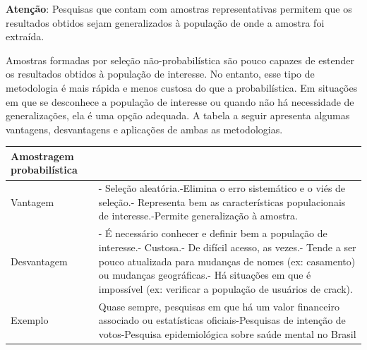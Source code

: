 \documentclass[
]{book}
\begin{document}
\textbf{Atenção}: Pesquisas que contam com amostras representativas permitem que os resultados obtidos sejam generalizados à população de onde a amostra foi extraída.

Amostras formadas por seleção não-probabilística são pouco capazes de estender os resultados obtidos à população de interesse. No entanto, esse tipo de metodologia é mais rápida e menos custosa do que a probabilística. Em situações em que se desconhece a população de interesse ou quando não há necessidade de generalizações, ela é uma opção adequada. A tabela a seguir apresenta algumas vantagens, desvantagens e aplicações de ambas as metodologias.

\begin{longtable}[]{@{}ll@{}}
\toprule
\begin{minipage}[b]{0.43\columnwidth}\raggedright
Amostragem probabilística\strut
\end{minipage} & \begin{minipage}[b]{0.51\columnwidth}\raggedright
\strut
\end{minipage}\tabularnewline
\midrule
\endhead
\begin{minipage}[t]{0.43\columnwidth}\raggedright
Vantagem\strut
\end{minipage} & \begin{minipage}[t]{0.51\columnwidth}\raggedright
- Seleção aleatória.-Elimina o erro sistemático e o viés de seleção.- Representa bem as características populacionais de interesse.-Permite generalização à amostra.\strut
\end{minipage}\tabularnewline
\begin{minipage}[t]{0.43\columnwidth}\raggedright
Desvantagem\strut
\end{minipage} & \begin{minipage}[t]{0.51\columnwidth}\raggedright
- É necessário conhecer e definir bem a população de interesse.- Custosa.- De difícil acesso, as vezes.- Tende a ser pouco atualizada para mudanças de nomes (ex: casamento) ou mudanças geográficas.- Há situações em que é impossível (ex: verificar a população de usuários de crack).\strut
\end{minipage}\tabularnewline
\begin{minipage}[t]{0.43\columnwidth}\raggedright
Exemplo\strut
\end{minipage} & \begin{minipage}[t]{0.51\columnwidth}\raggedright
Quase sempre, pesquisas em que há um valor financeiro associado ou estatísticas oficiais-Pesquisas de intenção de votos-Pesquisa epidemiológica sobre saúde mental no Brasil\strut

\end{minipage}
\end{longtable}
\end{document}
